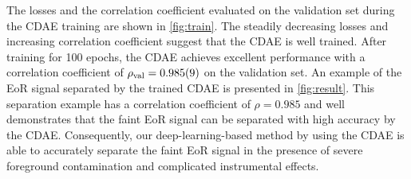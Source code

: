 \documentclass[letters,a4paper,fleqn,usenatbib]{mnras}
\newcommand{\R}[1]{\mathrm{#1}}
\begin{document}
The losses and the correlation coefficient evaluated on the validation
set during the CDAE training are shown in \autoref{fig:train}.
The steadily decreasing losses and increasing correlation coefficient
suggest that the CDAE is well trained.
After training for 100 epochs, the CDAE achieves excellent performance
with a correlation coefficient of $\rho_{\R{val}} = \num{0.985 +- 0.009}$
on the validation set.
An example of the EoR signal separated by the trained CDAE is presented
in \autoref{fig:result}.
This separation example has a correlation coefficient of $\rho = 0.985$
and well demonstrates that the faint EoR signal can be separated with
high accuracy by the CDAE.
Consequently, our deep-learning-based method by using the CDAE is able
to accurately separate the faint EoR signal in the presence of severe
foreground contamination and complicated instrumental effects.
\end{document}
